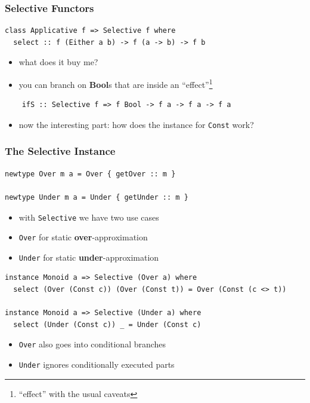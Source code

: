 \documentclass[aspectratio=169]{beamer}
\begin{document}
\begin{frame}[fragile]
  \frametitle{Selective Functors}
  \begin{verbatim}
class Applicative f => Selective f where
  select :: f (Either a b) -> f (a -> b) -> f b
  \end{verbatim}
  \vspace{5mm}
  \begin{itemize}
  \item what does it buy me?
  \item you can branch on \textbf{Bool}s that are inside an ``effect''\footnote{``effect'' with the usual caveats}
  \end{itemize}
  \begin{verbatim}
    ifS :: Selective f => f Bool -> f a -> f a -> f a
  \end{verbatim}
\end{frame}

\begin{frame}[fragile]
  \begin{itemize}
  \item now the interesting part: how does the instance for \texttt{Const} work?
  \end{itemize}
\end{frame}

\begin{frame}[fragile]
  \frametitle{The Selective Instance}
  \begin{verbatim}
newtype Over m a = Over { getOver :: m }

newtype Under m a = Under { getUnder :: m }
  \end{verbatim}
  \vfill
  \begin{itemize}
  \item with \texttt{Selective} we have two use cases
  \item \texttt{Over} for static \textbf{over}-approximation
  \item \texttt{Under} for static \textbf{under}-approximation
  \end{itemize}
\end{frame}

\begin{frame}[fragile]
  \begin{verbatim}
instance Monoid a => Selective (Over a) where
  select (Over (Const c)) (Over (Const t)) = Over (Const (c <> t))

instance Monoid a => Selective (Under a) where
  select (Under (Const c)) _ = Under (Const c)
  \end{verbatim}
  \vfill
  \begin{itemize}
  \item \texttt{Over} also goes into conditional branches
  \item \texttt{Under} ignores conditionally executed parts
  \end{itemize}
\end{frame}
\end{document}
